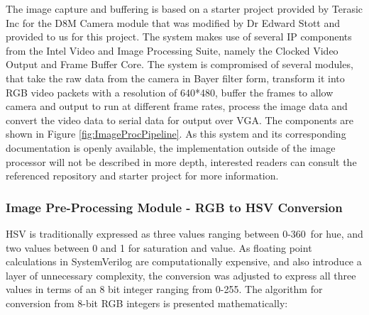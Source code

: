 \documentclass[a4paper]{article}
\begin{document}
The image capture and buffering is based on a starter project provided
by Terasic Inc for the D8M Camera module that was modified by Dr Edward Stott 
\cite{EEE2Rover} and provided to us for this project. The system makes use of 
several IP components from the Intel Video and Image Processing Suite,
namely the Clocked Video Output and Frame Buffer Core. The system is compromised
of several modules, that take the raw data from the camera in Bayer filter form\cite{TerasicD8MWeb},
transform it into RGB video packets with a resolution of 640*480, buffer the frames to allow camera and output
to run at different frame rates, process the image data and convert the video 
data to serial data for output over VGA.\cite{EEE2Rover} The components are shown in
Figure \ref{fig:ImageProcPipeline}. As this system and its 
corresponding documentation is openly available, the implementation outside of 
the image processor will not be described in more depth, interested readers can 
consult the referenced repository and starter project for more information. 

\subsubsection{Image Pre-Processing Module - RGB to HSV Conversion} 


HSV is traditionally expressed as three values ranging between 0-360\degree\  
for hue, and two values between 0 and 1 for saturation and value.\cite{10.1145/965139.807361}
As floating point calculations in SystemVerilog are computationally expensive, 
and also introduce a layer of unnecessary complexity, the conversion was adjusted
to express all three values in terms of an 8 bit integer ranging from 0-255. The
algorithm for conversion from 8-bit RGB integers is presented mathematically:
\end{document}
